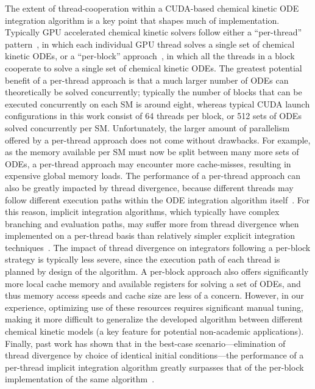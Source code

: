 \documentclass[preprint]{elsarticle}
\begin{document}
The extent of thread-cooperation within a CUDA-based chemical kinetic ODE integration algorithm is a key point that shapes much of implementation.
Typically GPU accelerated chemical kinetic solvers follow either a ``per-thread'' pattern~\cite{Niemeyer:2011aa,Stone:2013aa,Niemeyer:2014aa}, in which each individual GPU thread solves a single set of chemical kinetic ODEs, or a ``per-block'' approach~\cite{Stone:2013aa,Sewerin20151375}, in which all the threads in a block cooperate to solve a single set of chemical kinetic ODEs.
The greatest potential benefit of a per-thread approach is that a much larger number of ODEs can theoretically be solved concurrently; typically the number of blocks that can be executed concurrently on each SM is around eight, whereas typical CUDA launch configurations in this work consist of 64 threads per block, or 512 sets of ODEs solved concurrently per SM.
Unfortunately, the larger amount of parallelism offered by a per-thread approach does not come without drawbacks.
For example, as the memory available per SM must now be split between many more sets of ODEs, a per-thread approach may encounter more cache-misses, resulting in expensive global memory loads.
The performance of a per-thread approach can also be greatly impacted by thread divergence, because different threads may follow different execution paths within the ODE integration algorithm itself~\cite{Stone:2013aa,Niemeyer:2014aa}.
For this reason, implicit integration algorithms, which typically have complex branching and evaluation paths, may suffer more from thread divergence when implemented on a per-thread basis than relatively simpler explicit integration techniques~\cite{Stone:2013aa}.
The impact of thread divergence on integrators following a per-block strategy is typically less severe, since the execution path of each thread is planned by design of the algorithm.
A per-block approach also offers significantly more local cache memory and available registers for solving a set of ODEs, and thus memory access speeds and cache size are less of a concern.
However, in our experience, optimizing use of these resources requires significant manual tuning, making it more difficult to generalize the developed algorithm between different chemical kinetic models (a key feature for potential non-academic applications).
Finally, past work has shown that in the best-case scenario---elimination of thread divergence by choice of identical initial conditions---the performance of a per-thread implicit integration algorithm greatly surpasses that of the per-block implementation of the same algorithm~\cite{Stone:2013aa}.
\end{document}

